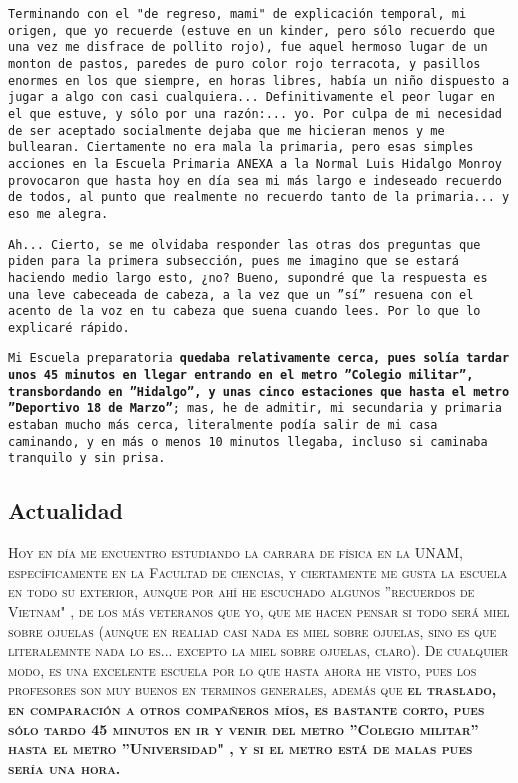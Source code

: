\documentclass[12pt,letterpaper]{article}
\begin{document}
{\texttt{Terminando con el "de regreso, mami" de explicación temporal, mi origen, que yo recuerde (estuve en un kinder, pero sólo recuerdo que una vez me disfrace de pollito rojo), fue aquel hermoso lugar de un monton de pastos, paredes de puro color rojo terracota, y pasillos enormes en los que siempre, en horas libres, había un niño dispuesto a jugar a algo con casi cualquiera... Definitivamente el peor lugar en el que estuve, y sólo por una razón:... yo. Por culpa de mi necesidad de ser aceptado socialmente dejaba que me hicieran menos y me bullearan. Ciertamente no era mala la primaria, pero esas simples acciones en la Escuela Primaria ANEXA a la Normal Luis Hidalgo Monroy provocaron que hasta hoy en día sea mi más largo e indeseado recuerdo de todos, al punto que realmente no recuerdo tanto de la primaria... y eso me alegra.\\}}

{\texttt{Ah... Cierto, se me olvidaba responder las otras dos preguntas que piden para la primera subsección, pues me imagino que se estará haciendo medio largo esto, ¿no? Bueno, supondré que la respuesta es una leve cabeceada de cabeza, a la vez que un ''sí'' resuena con el acento de la voz en tu cabeza que suena cuando lees. Por lo que lo explicaré rápido.\\}}

{\texttt{Mi Escuela preparatoria {\large{\textbf{quedaba relativamente cerca, pues solía tardar unos 45 minutos en llegar entrando en el metro ''Colegio militar'', transbordando en ''Hidalgo'', y unas cinco estaciones que hasta el metro ''Deportivo 18 de Marzo''}}}; mas, he de admitir, mi secundaria y primaria estaban mucho más cerca, literalmente podía salir de mi casa caminando, y en más o menos 10 minutos llegaba, incluso si caminaba tranquilo y sin prisa.}}\\

    \subsection{\huge{Actualidad}}

{\textsc{Hoy en día me encuentro estudiando la carrara de física en la UNAM, específicamente en la Facultad de ciencias, y ciertamente me gusta la escuela en todo su exterior, aunque por ahí he escuchado algunos ''recuerdos de Vietnam" , de los más veteranos que yo, que me hacen pensar si todo será miel sobre ojuelas (aunque en realiad casi nada es miel sobre ojuelas, sino es que literalemnte nada lo es... excepto la miel sobre ojuelas, claro). De cualquier modo, es una excelente escuela por lo que hasta ahora he visto, pues los profesores son muy buenos en terminos generales, además que {\large{\textbf{el traslado, en comparación a otros compañeros míos, es bastante corto, pues sólo tardo 45 minutos en ir y venir del metro ''Colegio militar'' hasta el metro ''Universidad" , y si el metro está de malas pues sería una hora.}}}}}
\end{document}
